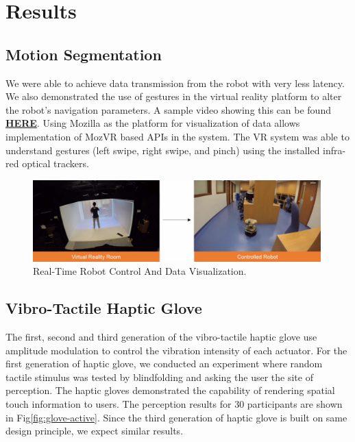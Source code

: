 \chapter{Results}
\section{Motion Segmentation}
We were able to achieve data transmission from the robot with very
less latency. We also demonstrated the use of gestures in the virtual
reality platform to alter the robot's navigation parameters. A sample
video showing this can be found \href{https://vimeo.com/192891505}{\bf
  HERE}. Using Mozilla as the platform for visualization of data allows implementation of MozVR based APIs in the system. The VR system was able to understand gestures (left swipe, right swipe, and pinch) using the installed infra-red optical trackers.
\begin{figure}[h!]
  \begin{center}
    \includegraphics[width=0.99\textwidth]{figures/motion-seg/result}%
  \end{center}
  \caption{Real-Time Robot Control And Data Visualization.}
  \label{fig:result-motion}
\end{figure}

\section{Vibro-Tactile Haptic Glove}
The first, second and third generation of the vibro-tactile haptic
glove use amplitude modulation to control the vibration intensity of
each actuator. For the first generation of haptic glove, we conducted
an experiment where random tactile stimulus was tested by blindfolding
and asking the user the site of perception. The haptic gloves
demonstrated the capability of rendering spatial touch information to
users. The perception results for 30 participants are shown in
Fig\ref{fig:glove-active}. Since the third generation of haptic glove
is built on same design principle, we expect similar results.

